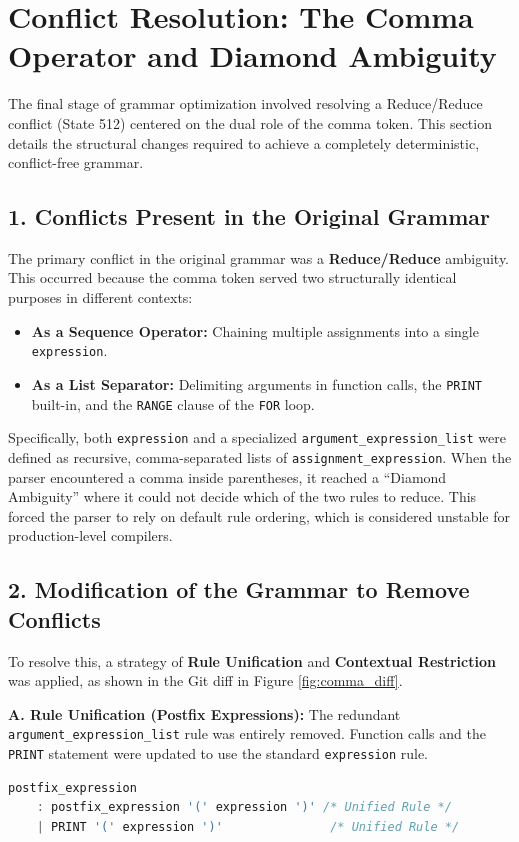 \documentclass[a4paper,12pt]{article}
\begin{document}
\section{Conflict Resolution: The Comma Operator and Diamond Ambiguity}

The final stage of grammar optimization involved resolving a Reduce/Reduce conflict (State 512) centered on the dual role of the comma token. This section details the structural changes required to achieve a completely deterministic, conflict-free grammar.

\subsection{1. Conflicts Present in the Original Grammar}
The primary conflict in the original grammar was a \textbf{Reduce/Reduce} ambiguity. This occurred because the comma token served two structurally identical purposes in different contexts:
\begin{itemize}
    \item \textbf{As a Sequence Operator:} Chaining multiple assignments into a single \texttt{expression}.
    \item \textbf{As a List Separator:} Delimiting arguments in function calls, the \texttt{PRINT} built-in, and the \texttt{RANGE} clause of the \texttt{FOR} loop.
\end{itemize}

Specifically, both \texttt{expression} and a specialized \texttt{argument\_expression\_list} were defined as recursive, comma-separated lists of \texttt{assignment\_expression}. When the parser encountered a comma inside parentheses, it reached a ``Diamond Ambiguity'' where it could not decide which of the two rules to reduce. This forced the parser to rely on default rule ordering, which is considered unstable for production-level compilers.

\subsection{2. Modification of the Grammar to Remove Conflicts}
To resolve this, a strategy of \textbf{Rule Unification} and \textbf{Contextual Restriction} was applied, as shown in the Git diff in Figure \ref{fig:comma_diff}.

\textbf{A. Rule Unification (Postfix Expressions):}
The redundant \texttt{argument\_expression\_list} rule was entirely removed. Function calls and the \texttt{PRINT} statement were updated to use the standard \texttt{expression} rule.
\begin{lstlisting}[language=C]
postfix_expression
    : postfix_expression '(' expression ')' /* Unified Rule */
    | PRINT '(' expression ')'               /* Unified Rule */
\end{lstlisting}
\end{document}
